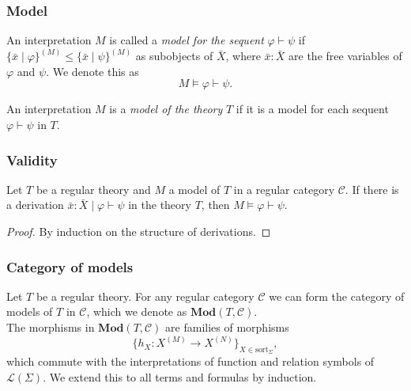 \documentclass[14pt]{beamer}
\theoremstyle{plain}
\begin{document}
  \begin{frame}
    \frametitle{Model}
    \begin{definition}
      An interpretation $M$ is called a \emph{model for the sequent}
      $\varphi \vdash \psi$ 
      \pause
      if 
      $\{ \bar{x} \mid \varphi \}^{(M)} \leq \{\bar{x} \mid \psi \}^{(M)}$
      as subobjects of $\bar{X}$, \pause
      where $\bar{x} : \bar{X}$ are the free variables
      of $\varphi$ and $\psi$. \pause
      We denote this as
      \[ M \models \varphi \vdash \psi. \]
    \end{definition}
    \pause
    \begin{definition}
      An interpretation $M$ is a \emph{model of the theory} $T$ if it is a model
      for each sequent $\varphi \vdash \psi$ in $T$.
    \end{definition}
  \end{frame}

  \begin{frame}
    \frametitle{Validity}
    \begin{theorem}
      Let $T$ be a regular theory and $M$ a model of $T$ in a regular category
      $\mathcal{C}$. \pause
      If there is a derivation
      $\bar{x} : \bar{X} \mid \varphi \vdash \psi$ in the theory $T$, then
      $M \models \varphi \vdash \psi$.
    \end{theorem}
    \pause
    \begin{proof}
      By induction on the structure of derivations.
    \end{proof}
  \end{frame}

  \begin{frame}
    \frametitle{Category of models}
    Let $T$ be a regular theory. \pause For any regular category $\mathcal{C}$ we can form
    the category of models of $T$ in $\mathcal{C}$, which we denote as
    $\mathbf{Mod}(T, \mathcal{C})$.
    \pause \\
    The morphisms in $\mathbf{Mod}(T, \mathcal{C})$ are families of morphisms
    $$\{h_X : X^{(M)} \to X^{(N)} \}_{X \in \mathrm{sort}_{\Sigma}},$$
    \pause
    which commute with the interpretations of function and relation symbols of
    $\mathcal{L}(\Sigma)$. \pause We extend this to all terms and formulas by induction.

  \end{frame}
\end{document}

